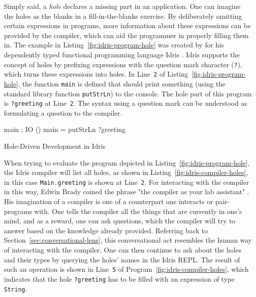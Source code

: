 Simply said, a \emph{hole} declares a missing part in an application.
One can imagine the holes as the blanks in a fill-in-the-blanks exercise.
By deliberately omitting certain expressions in programs, more information about these expressions can be provided by the compiler, which can aid the programmer in properly filling them in.
The example in Listing~\ref{fig:idris-program-hole} was created by \citeauthor{brady_type-driven_2017} for his dependently typed functional programming language Idris \cite{brady_type-driven_2017}.
Idris supports the concept of holes by prefixing expressions with the question mark character (\texttt{?}), which turns these expressions into holes.
In Line~\verb|2| of Listing~\ref{fig:idris-program-hole}, the function \verb|main| is defined that should print something (using the standard library function \verb|putStrLn|) to the console.
The hole part of this program is \verb|?greeting| at Line~\verb|2|.
The syntax using a question mark can be understood as formulating a question to the compiler.

\begin{program}
\begin{GenericCode}
main : IO ()
main = putStrLn ?greeting
\end{GenericCode}
\caption{Hole-Driven Development in Idris}
\label{fig:idris-program-hole}
\end{program}

When trying to evaluate the program depicted in Listing~\ref{fig:idris-program-hole}, the Idris compiler will list all holes, as shown in Listing~\ref{fig:idris-compiler-holes}, in this case \texttt{Main.greeting} is shown at Line~\verb|2|.
For interacting with the compiler in this way, Edwin Brady coined the phrase "the compiler as your lab assistant" \cite{brady_type-driven_2017}.
His imagination of a compiler is one of a counterpart one interacts or pair-programs with.
One tells the compiler all the things that are currently in one's mind, and as a reward, one can ask questions, which the compiler will try to answer based on the knowledge already provided.
Referring back to Section~\ref{sec:conversational-lens}, this conversational act resembles the human way of interacting with the compiler.
One can then continue to ask about the holes and their types by querying the holes' names in the Idris REPL.
The result of such an operation is shown in Line~\verb|5| of Program~\ref{fig:idris-compiler-holes}, which indicates that the hole \texttt{?greeting} has to be filled with an expression of type \texttt{String}.

